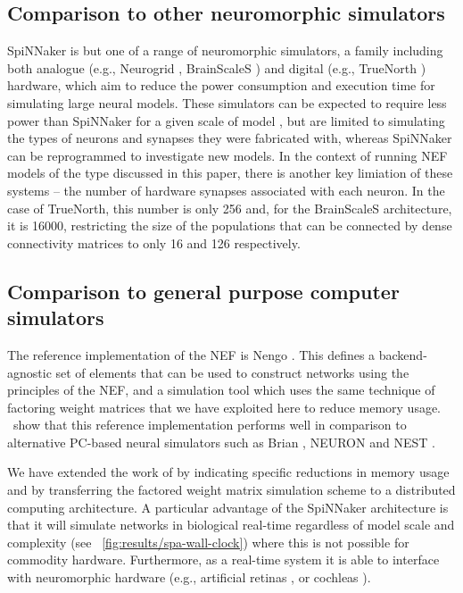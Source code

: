 \documentclass[conference]{IEEEtran}
\begin{document}
  \subsection{Comparison to other neuromorphic simulators}

  SpiNNaker is but one of a range of neuromorphic simulators, a family including both analogue (e.g., Neurogrid \parencite{Benjamin2014}, BrainScaleS \parencite{Schemmel2010}) and digital (e.g., TrueNorth \parencite{Merolla2014}) hardware, which aim to reduce the power consumption and execution time for simulating large neural models.
  These simulators can be expected to require less power than SpiNNaker for a given scale of model \parencite{Stromatias2013}, but are limited to simulating the types of neurons and synapses they were fabricated with, whereas SpiNNaker can be reprogrammed to investigate new models.
  In the context of running NEF models of the type discussed in this paper, there is another key limiation of these systems -- the number of hardware synapses associated with each neuron. In the case of TrueNorth, this number is only \num{256} and, for the BrainScaleS architecture, it is \num{16000}, restricting the size of the populations that can be connected by dense connectivity matrices to only 16 and 126 respectively.

  \subsection{Comparison to general purpose computer simulators}

  The reference implementation of the NEF is Nengo \parencite{Bekolay2014}.
  This defines a backend-agnostic set of elements that can be used to construct networks using the principles of the NEF, and a simulation tool which uses the same technique of factoring weight matrices that we have exploited here to reduce memory usage.
  \textcite*{Bekolay2014}\ show that this reference implementation performs well in comparison to alternative PC-based neural simulators such as Brian \parencite{Goodman2009}, NEURON \parencite{carnevale2006neuron} and NEST \parencite{Gewaltig2007}.

  We have extended the work of \citeauthor*{Bekolay2014} by indicating specific reductions in memory usage and by transferring the factored weight matrix simulation scheme to a distributed computing architecture.
  A particular advantage of the SpiNNaker architecture is that it will simulate networks in biological real-time regardless of model scale and complexity (see \figurename~\ref{fig:results/spa-wall-clock}) where this is not possible for commodity hardware.
  Furthermore, as a real-time system it is able to interface with neuromorphic hardware (e.g., artificial retinas \parencite{}, or cochleas \parencite{}).
\end{document}
